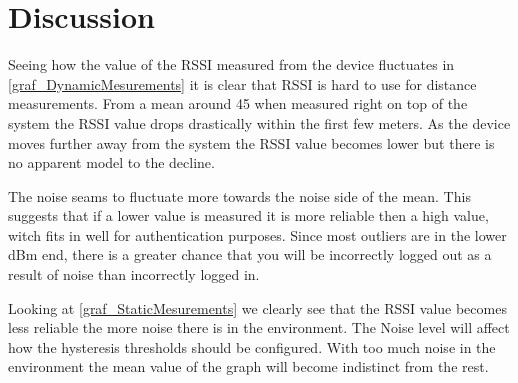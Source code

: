 \section{Discussion}
Seeing how the value of the RSSI measured from the device fluctuates in \cref{graf_DynamicMesurements} it is clear that RSSI is hard to use for distance measurements.
From a mean around 45 when measured right on top of the system the RSSI value drops drastically within the first few meters.
As the device moves further away from the system the RSSI value becomes lower but there is no apparent model to the decline.

The noise seams to fluctuate more towards the noise side of the mean. This suggests that if a lower value is measured it is more reliable then a high value, witch fits in well for authentication purposes.
Since most outliers are in the lower dBm end, there is a greater chance that you will be incorrectly logged out as a result of noise than incorrectly logged in.

Looking at \cref{graf_StaticMesurements} we clearly see that the RSSI value becomes less reliable the more noise there is in the environment.
The Noise level will affect how the hysteresis thresholds should be configured.
With too much noise in the environment the mean value of the graph will become indistinct from the rest.

